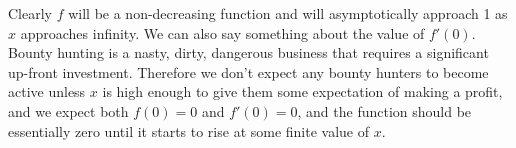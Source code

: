 Clearly $f$ will be a non-decreasing function and will asymptotically
approach 1 as $x$ approaches infinity. We can also say something about
the value of $f'(0)$. Bounty hunting is a nasty, dirty, dangerous business
that requires a significant up-front investment. Therefore we don't
expect any bounty hunters to become active unless $x$ is high enough
to give them some expectation of making a profit, and we expect
both $f(0)=0$ and $f'(0)=0$, and the function should be essentially
zero until it starts to rise at some finite value of $x$.

